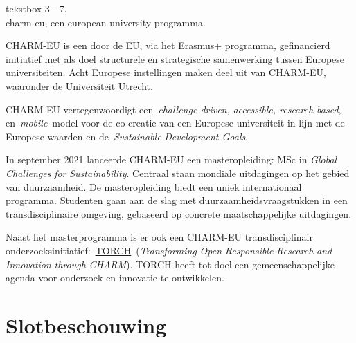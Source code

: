 \documentclass[empirical, authordate, ]{new-jote-article}
\begin{document}
	\begin{bookbox}{\raggedright tekstbox 3 - 7. \\charm-eu, een european university programma.}
		CHARM-EU is een door de EU, via het Erasmus+ programma, gefinancierd initiatief met als doel structurele en strategische samenwerking tussen Europese universiteiten. Acht Europese instellingen maken deel uit van CHARM-EU, waaronder de Universiteit Utrecht.

		\vspace*{\baselineskip}

		CHARM-EU vertegenwoordigt een \emph{challenge-driven}\emph{, }\emph{accessible}\emph{, research-}\emph{based}, en \emph{mobile} model voor de co-creatie van een Europese universiteit in lijn met de Europese waarden en de \emph{Sustainable}\emph{ Development Goals}.

		\vspace*{\baselineskip}

		In september 2021 lanceerde CHARM-EU een masteropleiding: MSc in \emph{Global }\emph{Challenges}\emph{ }\emph{for}\emph{ }\emph{Sustainability}. Centraal staan mondiale uitdagingen op het gebied van duurzaamheid. De masteropleiding biedt een uniek internationaal programma. Studenten gaan aan de slag met duurzaamheidsvraagstukken in een transdisciplinaire omgeving, gebaseerd op concrete maatschappelijke uitdagingen.

		\vspace*{\baselineskip}

		Naast het masterprogramma is er ook een CHARM-EU transdisciplinair onderzoeksinitiatief: \href{https://www.charm-eu.eu/torch}{TORCH} (\emph{Transforming}\emph{ Open }\emph{Responsible}\emph{ Research }\emph{and}\emph{ }\emph{Innovation}\emph{ }\emph{through}\emph{ CHARM}). TORCH heeft tot doel een gemeenschappelijke agenda voor onderzoek en innovatie te ontwikkelen.
	\end{bookbox}

	\section{Slotbeschouwing}
\end{document}
